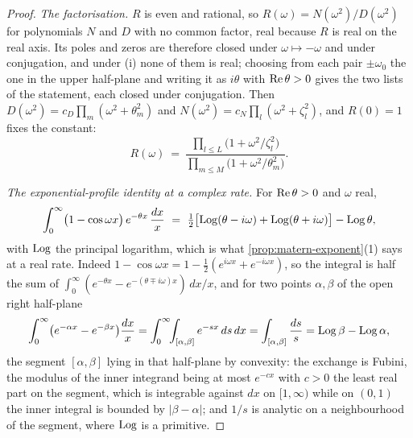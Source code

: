 \begin{proof}
\emph{The factorisation.} $R$ is even and rational, so $R(\omega) = N(\omega^2)/D(\omega^2)$ for
polynomials $N$ and $D$ with no common factor, real because $R$ is real on the real axis. Its
poles and zeros are therefore closed under $\omega \mapsto -\omega$ and under conjugation, and
under (i) none of them is real; choosing from each pair $\pm\omega_0$ the one in the upper
half-plane and writing it as $i\theta$ with $\operatorname{Re}\theta > 0$ gives the two lists of the statement,
each closed under conjugation. Then $D(\omega^2) = c_D\prod_m(\omega^2 + \theta_m^2)$ and
$N(\omega^2) = c_N\prod_l(\omega^2 + \zeta_l^2)$, and $R(0) = 1$ fixes the constant:
\begin{equation}\label{eq:rational-factored}
  R(\omega) \ =\ \frac{\prod_{l \le L}\bigl(1 + \omega^2/\zeta_l^2\bigr)}
                      {\prod_{m \le M}\bigl(1 + \omega^2/\theta_m^2\bigr)} .
\end{equation}

\emph{The exponential-profile identity at a complex rate.} For $\operatorname{Re}\theta > 0$ and $\omega$ real,
\begin{equation}\label{eq:complex-frullani}
  \int_0^\infty \bigl(1 - \cos\omega x\bigr)\,e^{-\theta x}\,\frac{dx}{x}
   \ =\ \tfrac12\bigl[\operatorname{Log}(\theta - i\omega) + \operatorname{Log}(\theta + i\omega)\bigr] - \operatorname{Log}\theta ,
\end{equation}
with $\operatorname{Log}$ the principal logarithm, which is what \ref{prop:matern-exponent}(1) says at a real
rate. Indeed $1 - \cos\omega x = 1 - \tfrac12(e^{i\omega x} + e^{-i\omega x})$, so the integral is
half the sum of $\int_0^\infty(e^{-\theta x} - e^{-(\theta \mp i\omega)x})\,dx/x$, and for two
points $\alpha,\beta$ of the open right half-plane
\[
  \int_0^\infty \bigl(e^{-\alpha x} - e^{-\beta x}\bigr)\frac{dx}{x}
   = \int_0^\infty\!\!\int_{[\alpha,\beta]} e^{-sx}\,ds\,dx
   = \int_{[\alpha,\beta]}\frac{ds}{s} = \operatorname{Log}\beta - \operatorname{Log}\alpha ,
\]
the segment $[\alpha,\beta]$ lying in that half-plane by convexity: the exchange is Fubini, the
modulus of the inner integrand being at most $e^{-cx}$ with $c > 0$ the least real part on the
segment, which is integrable against $dx$ on $[1,\infty)$ while on $(0,1)$ the inner integral is
bounded by $|\beta - \alpha|$; and $1/s$ is analytic on a neighbourhood of the segment, where
$\operatorname{Log}$ is a primitive.


\end{proof}
